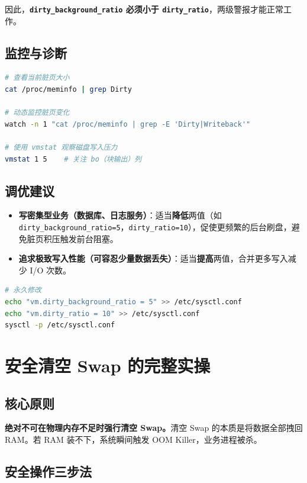 因此，\textbf{\texttt{dirty\_background\_ratio} 必须小于 \texttt{dirty\_ratio}}，两级警报才能正常工作。

\section{监控与诊断}

\begin{lstlisting}[language=bash]
# 查看当前脏页大小
cat /proc/meminfo | grep Dirty

# 动态监控脏页变化
watch -n 1 "cat /proc/meminfo | grep -E 'Dirty|Writeback'"

# 使用 vmstat 观察磁盘写入压力
vmstat 1 5    # 关注 bo（块输出）列
\end{lstlisting}

\section{调优建议}

\begin{itemize}[leftmargin=2cm]
	\item \textbf{写密集型业务（数据库、日志服务）}：适当\textbf{降低}两值（如 \texttt{dirty\_background\_ratio=5}，\texttt{dirty\_ratio=10}），促使更频繁的后台刷盘，避免脏页积压触发前台阻塞。
	\item \textbf{追求极致写入性能（可容忍少量数据丢失）}：适当\textbf{提高}两值，合并更多写入减少 I/O 次数。
\end{itemize}

\begin{lstlisting}[language=bash]
# 永久修改
echo "vm.dirty_background_ratio = 5" >> /etc/sysctl.conf
echo "vm.dirty_ratio = 10" >> /etc/sysctl.conf
sysctl -p /etc/sysctl.conf
\end{lstlisting}


\chapter{安全清空 Swap 的完整实操}

\section{核心原则}

\textbf{绝对不可在物理内存不足时强行清空 Swap。}清空 Swap 的本质是将数据全部拽回 RAM。若 RAM 装不下，系统瞬间触发 OOM Killer，业务进程被杀。

\section{安全操作三步法}


